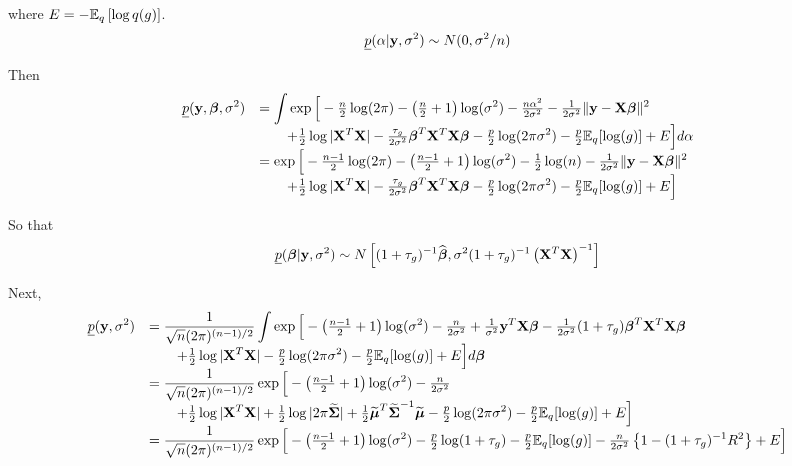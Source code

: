 \documentclass{article}[12pt]
\begin{document}
\noindent where $E = - {\mathbb E}_q\left[ \log q(g) \right]$. 
$$
\displaystyle \underline{p}(\alpha|{\bf y},\sigma^2) \sim N(0,\sigma^2/n)
$$

\noindent 
Then
$$
\begin{array}{rl}
\displaystyle \underline{p}({\bf y},{\boldsymbol \beta},\sigma^2) 
& \displaystyle = \int \exp\Big[
- \tfrac{n}{2}\log(2\pi)
- \left( \tfrac{n}{2} + 1 \right) \log(\sigma^2)
- \tfrac{n\alpha^2}{2\sigma^2}
- \tfrac{1}{2\sigma^2}\|{\bf y} - {\bf X}{\boldsymbol \beta}\|^2
\\
& \displaystyle \qquad 
+ \tfrac{1}{2}\log|{\bf X}^T{\bf X}|
- \tfrac{\tau_g}{2\sigma^2} {\boldsymbol \beta}^T{\bf X}^T{\bf X}{\boldsymbol \beta} 
- \tfrac{p}{2}\log(2\pi\sigma^2)
- \tfrac{p}{2}{\mathbb E}_q[\log(g)] + E
\Big] d\alpha 
\\
& \displaystyle = \exp\Big[
- \tfrac{n-1}{2}\log(2\pi)
- \left( \tfrac{n-1}{2} + 1 \right) \log(\sigma^2)
- \tfrac{1}{2}\log(n)
- \tfrac{1}{2\sigma^2}\|{\bf y} - {\bf X}{\boldsymbol \beta}\|^2
\\
& \displaystyle \qquad 
+ \tfrac{1}{2}\log|{\bf X}^T{\bf X}|
- \tfrac{\tau_g}{2\sigma^2} {\boldsymbol \beta}^T{\bf X}^T{\bf X}{\boldsymbol \beta} 
- \tfrac{p}{2}\log(2\pi\sigma^2)
- \tfrac{p}{2}{\mathbb E}_q[\log(g)] + E
\Big]   
\end{array}
$$

\noindent So that
$$
\displaystyle \underline{p}({\boldsymbol \beta}|{\bf y},\sigma^2) \sim N\left[
(1 + \tau_g)^{-1}\widehat{{\boldsymbol \beta}},
\sigma^2 (1 + \tau_g)^{-1} \left( {\bf X}^T{\bf X} \right)^{-1}
\right]
$$

\noindent Next,
$$
\begin{array}{rl}
\displaystyle \underline{p}({\bf y},\sigma^2) 
& \displaystyle = \frac{1}{\sqrt{n}(2\pi)^{(n-1)/2}} \int \exp\Big[
- \left( \tfrac{n-1}{2} + 1 \right) \log(\sigma^2)
- \tfrac{n}{2\sigma^2} 
+ \tfrac{1}{\sigma^2}{\bf y}^T{\bf X}{\boldsymbol \beta}
- \tfrac{1}{2\sigma^2}(1 + \tau_g) {\boldsymbol \beta}^T{\bf X}^T{\bf X}{\boldsymbol \beta}
\\
& \displaystyle \qquad  
+ \tfrac{1}{2}\log|{\bf X}^T{\bf X}|
- \tfrac{p}{2}\log(2\pi\sigma^2)
- \tfrac{p}{2}{\mathbb E}_q[\log(g)] + E
\Big] d{\boldsymbol \beta} 
\\
& \displaystyle = \frac{1}{\sqrt{n}(2\pi)^{(n-1)/2}} \exp\Big[
- \left( \tfrac{n-1}{2} + 1 \right) \log(\sigma^2)
- \tfrac{n}{2\sigma^2} 
\\
& \displaystyle \qquad 
+ \tfrac{1}{2}\log|{\bf X}^T{\bf X}|
+ \tfrac{1}{2}\log|2\pi\widetilde{{\boldsymbol \Sigma}}|
+ \tfrac{1}{2}\widetilde{{\boldsymbol \mu}}^T\widetilde{{\boldsymbol \Sigma}}^{-1}\widetilde{{\boldsymbol \mu}}
- \tfrac{p}{2}\log(2\pi\sigma^2)
- \tfrac{p}{2}{\mathbb E}_q[\log(g)] + E
\Big] 
\\
& \displaystyle = \frac{1}{\sqrt{n}(2\pi)^{(n-1)/2}} \exp\Big[
- \left( \tfrac{n-1}{2} + 1 \right) \log(\sigma^2)
- \tfrac{p}{2}\log(1 + \tau_g)
- \tfrac{p}{2}{\mathbb E}_q[\log(g)]
- \tfrac{n}{2\sigma^2} \left\{ 1 - (1 + \tau_g)^{-1}  R^2
\right\} + E
\Big] 
\end{array}
$$
\end{document}
